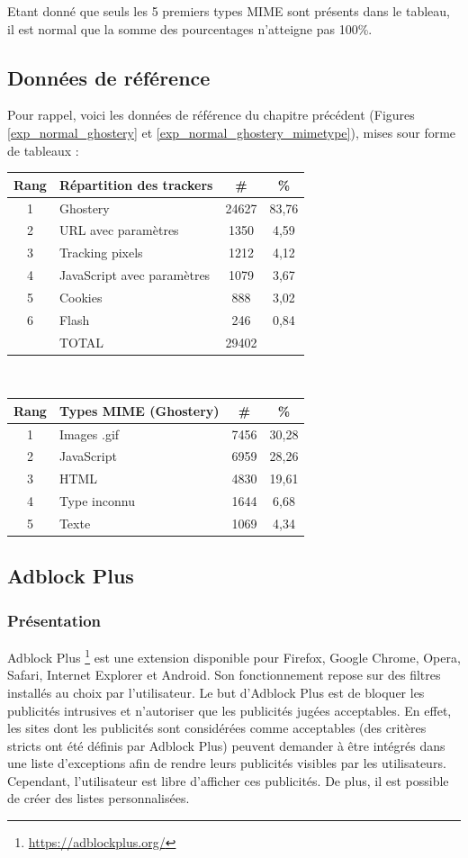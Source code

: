 Etant donné que seuls les 5 premiers types MIME sont présents dans le tableau, il est normal que la somme des pourcentages n'atteigne pas 100\%.
\newpage

\subsection{Données de référence}
Pour rappel, voici les données de référence du chapitre précédent (Figures \ref{exp_normal_ghostery} et \ref{exp_normal_ghostery_mimetype}), mises sour forme de tableaux :\\

\begin{tabular}{ c | p{5cm} | c | c | }
   Rang & Répartition des trackers & \# & \% \\
   \hline
   \hline
   1 & Ghostery & 24627 & 83,76 \\
   2 & URL avec paramètres & 1350 & 4,59 \\
   3 & Tracking pixels & 1212 & 4,12 \\
   4 & JavaScript avec paramètres & 1079 & 3,67 \\
   5 & Cookies & 888 & 3,02 \\
   6 & Flash & 246 & 0,84 \\
   \hline
    & TOTAL & 29402 \\
   \cline{1-3}
\end{tabular}
\\[1cm]

\begin{tabular}{ c | p{5cm} | c | c | }
   Rang & Types MIME (Ghostery) & \# & \% \\
   \hline
   \hline
   1 & Images .gif & 7456 & 30,28 \\
   2 & JavaScript & 6959 & 28,26 \\
   3 & HTML & 4830 & 19,61 \\
   4 & Type inconnu & 1644 & 6,68 \\
   5 & Texte & 1069 & 4,34 \\
   \hline
\end{tabular}

\subsection{Adblock Plus}
\subsubsection{Présentation}
Adblock Plus \footnote{\url{https://adblockplus.org/}} est une extension disponible pour Firefox, Google Chrome, Opera, Safari, Internet Explorer et Android. Son fonctionnement repose sur des filtres installés au choix par l'utilisateur. Le but d'Adblock Plus est de bloquer les publicités intrusives et n'autoriser que les publicités jugées acceptables. En effet, les sites dont les publicités sont considérées comme acceptables (des critères stricts ont été définis par Adblock Plus) peuvent demander à être intégrés dans une liste d'exceptions afin de rendre leurs publicités visibles par les utilisateurs. Cependant, l'utilisateur est libre d'afficher ces publicités. De plus, il est possible de créer des listes personnalisées.

